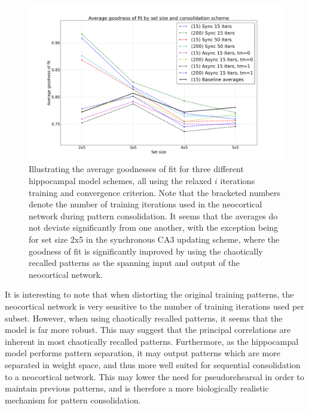 \begin{figure}
    \centering
    \includegraphics[width=14cm]{fig/neo-consolidation/consolidation-IO-span-all-with-baseline}
    \caption{Illustrating the average goodnesses of fit for three different hippocampal model schemes, all using the relaxed $i$ iterations training and convergence criterion. Note that the bracketed numbers denote the number of training iterations used in the neocortical network during pattern consolidation. It seems that the averages do not deviate significantly from one another, with the exception being for set size 2x5 in the synchronous CA3 updating scheme, where the goodness of fit is significantly improved by using the chaotically recalled patterns as the spanning input and output of the neocortical network.}
    \label{fig:consolidation-IO-span-all-with-baseline}
\end{figure}

It is interesting to note that when distorting the original training patterns, the neocortical network is very sensitive to the number of training iterations used per subset.
However, when using chaotically recalled patterns, it seems that the model is far more robust. This may suggest that the principal correlations are inherent in most chaotically recalled patterns. 
Furthermore, as the hippocampal model performs pattern separation, it may output patterns which are more separated in weight space, and thus more well suited for sequential consolidation to a neocortical network. This may lower the need for pseudorehearsal in order to maintain previous patterns, and is therefore a more biologically realistic mechanism for pattern consolidation. 

